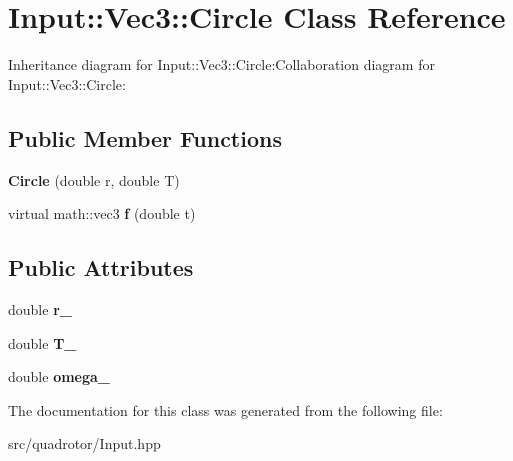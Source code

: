 \hypertarget{classInput_1_1Vec3_1_1Circle}{
\section{Input::Vec3::Circle Class Reference}
\label{classInput_1_1Vec3_1_1Circle}
}
Inheritance diagram for Input::Vec3::Circle:Collaboration diagram for Input::Vec3::Circle:\subsection*{Public Member Functions}
\begin{DoxyCompactItemize}
\item 
\hypertarget{classInput_1_1Vec3_1_1Circle_a37e8e683d26d784fa1cc05934f660384}{
{\bfseries Circle} (double r, double T)}
\label{classInput_1_1Vec3_1_1Circle_a37e8e683d26d784fa1cc05934f660384}

\item 
\hypertarget{classInput_1_1Vec3_1_1Circle_a8a20d13a80afea6b50d200acf9fcf956}{
virtual math::vec3 {\bfseries f} (double t)}
\label{classInput_1_1Vec3_1_1Circle_a8a20d13a80afea6b50d200acf9fcf956}

\end{DoxyCompactItemize}
\subsection*{Public Attributes}
\begin{DoxyCompactItemize}
\item 
\hypertarget{classInput_1_1Vec3_1_1Circle_a49ae5e8e06e3bfa8c66c98e13d89f706}{
double {\bfseries r\_\-}}
\label{classInput_1_1Vec3_1_1Circle_a49ae5e8e06e3bfa8c66c98e13d89f706}

\item 
\hypertarget{classInput_1_1Vec3_1_1Circle_a873c9bcd953193a827cfa9e92ea1740a}{
double {\bfseries T\_\-}}
\label{classInput_1_1Vec3_1_1Circle_a873c9bcd953193a827cfa9e92ea1740a}

\item 
\hypertarget{classInput_1_1Vec3_1_1Circle_a3dc1f92e4adb3f85ed7073d25e287cbc}{
double {\bfseries omega\_\-}}
\label{classInput_1_1Vec3_1_1Circle_a3dc1f92e4adb3f85ed7073d25e287cbc}

\end{DoxyCompactItemize}


The documentation for this class was generated from the following file:\begin{DoxyCompactItemize}
\item 
src/quadrotor/Input.hpp\end{DoxyCompactItemize}
